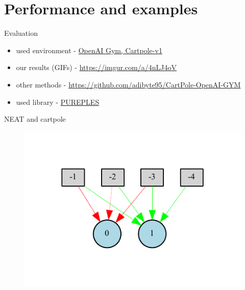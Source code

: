 \documentclass{beamer}
\begin{document}
\section{Performance and examples}
\begin{frame}{Evaluation}
    \begin{itemize}
        \item used environment - \href{https://gym.openai.com}{OpenAI Gym, Cartpole-v1}
        \item our results (GIFs) - \href{https://imgur.com/a/4nLJ4oV}{https://imgur.com/a/4nLJ4oV}
        \item other methods - \href{https://github.com/adibyte95/CartPole-OpenAI-GYM}{https://github.com/adibyte95/CartPole-OpenAI-GYM}
        \item used library - \href{https://github.com/ukuleleplayer/pureples}{PUREPLES}
    \end{itemize}
\end{frame}
\begin{frame}{NEAT and cartpole}
    \begin{figure}[c]
        \includegraphics[width=\textwidth]{pdf/neat_pole_balancing_winner.pdf}
    \end{figure}
\end{frame}
\end{document}
